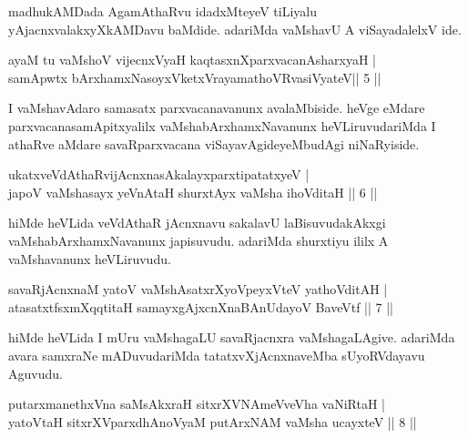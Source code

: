 \begin{artha}
madhukAMDada AgamAthaRvu idadxMteyeV tiLiyalu yAjacnxvalakxyXkAMDavu 
baMdide. adariMda vaMshavU A viSayadalelxV ide.
\end{artha}

\begin{shl}
ayaM tu vaMshoV vijecnxVyaH kaqtasxnXparxvacanAsharxyaH | \\
samApwtx bArxhamxNasoyxVketxVrayamathoVR\s vasiVyateV\hfill ||  5 ||  
\end{shl}

\begin{artha}
I vaMshavAdaro samasatx parxvacanavanunx avalaMbiside. heVge eMdare 
parxvacanasamApitxyalilx vaMshabArxhamxNavanunx heVLiruvudariMda I 
athaRve aMdare savaRparxvacana viSayavAgideyeMbudAgi niNaRyiside.
\end{artha}


\begin{shl}
ukatxveVdAthaRvijAcnxnasAkalayxparxtipatatxyeV | \\
japoV vaMshasayx yeVnAtaH shurxtAyx vaMsha ihoVditaH \hfill||  6 ||  
\end{shl}

\begin{artha}
hiMde heVLida veVdAthaR jAcnxnavu sakalavU laBisuvudakAkxgi 
vaMshabArxhamxNa\-vanunx japisuvudu. adariMda shurxtiyu ililx A 
vaMshavanunx heVLiruvudu.
\end{artha}


\begin{shl}
savaRjAcnxnaM yatoV vaMshAsatxrXyoV\s peyxVteV yathoVditAH | \\
atasatxtfsxmXqqtitaH samayxgAjxcnXnaBAnUdayoV BaveVtf \hfill||  7 ||  
\end{shl}

\begin{artha}
hiMde heVLida I mUru vaMshagaLU savaRjacnxra vaMshagaLAgive. adariMda 
avara samxraNe mADuvudariMda tatatxvXjAcnxnaveMba sUyoRVdayavu Aguvudu.
\end{artha}


\begin{shl}
putarxmanethxVna saMsAkxraH sitxrXVNAmeVveVha vaNiRtaH | \\
yatoV\s taH sitxrXVparxdhAnoV\s yaM putArxNAM vaMsha ucayxteV \hfill||  8 ||  
\end{shl}

